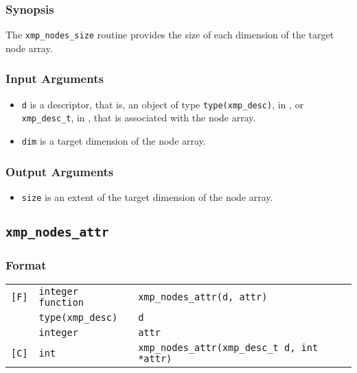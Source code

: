 \subsubsection*{Synopsis}

The {\tt xmp\_nodes\_size} routine provides the size of each dimension of the target node array.

\subsubsection*{Input Arguments}

\begin{itemize}
 \item {\tt d} is a descriptor, that is, an object of type 
       {\tt type(xmp\_desc)}, in {\XMPF}, or {\tt xmp\_desc\_t},
       in {\XMPC}, that is associated with the node array.
 \item {\tt dim} is a target dimension of the node array.
\end{itemize}

\subsubsection*{Output Arguments}

\begin{itemize}
 \item {\tt size} is an extent of the target dimension of the node array.
\end{itemize}


\subsection{\tt xmp\_nodes\_attr}

\subsubsection*{Format}

\begin{tabular}{lll}

\verb![F]!& {\tt integer function}& {\tt xmp\_nodes\_attr(d, attr)}\\
          & {\tt type(xmp\_desc)} & {\tt d}\\
          & {\tt integer} & {\tt attr}\\

\verb![C]!&  {\tt int}& {\tt xmp\_nodes\_attr(xmp\_desc\_t d, int *attr)}\\

\end{tabular}

